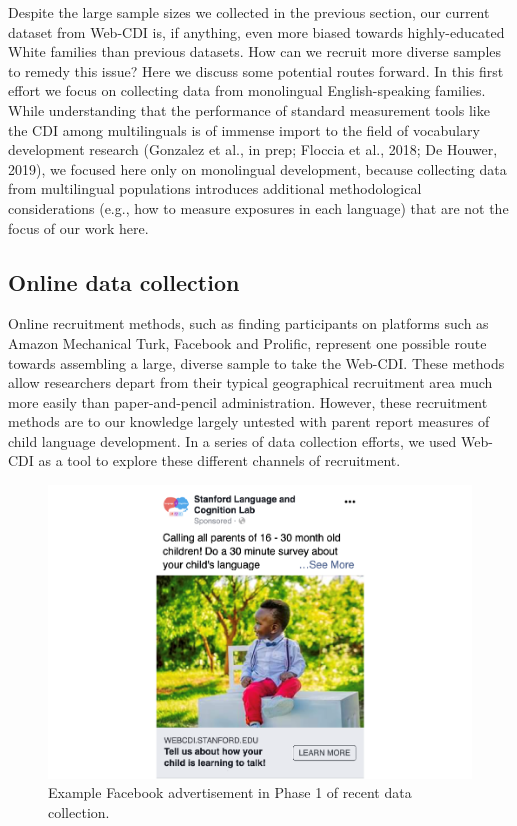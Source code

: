 \documentclass[
  english,
  ,man,floatsintext]{apa6}
\begin{document}
Despite the large sample sizes we collected in the previous section, our current dataset from Web-CDI is, if anything, even more biased towards highly-educated White families than previous datasets. How can we recruit more diverse samples to remedy this issue? Here we discuss some potential routes forward. In this first effort we focus on collecting data from monolingual English-speaking families. While understanding that the performance of standard measurement tools like the CDI among multilinguals is of immense import to the field of vocabulary development research (Gonzalez et al., in prep; Floccia et al., 2018; De Houwer, 2019), we focused here only on monolingual development, because collecting data from multilingual populations introduces additional methodological considerations (e.g., how to measure exposures in each language) that are not the focus of our work here.

\hypertarget{online-data-collection}{%
\subsection{Online data collection}\label{online-data-collection}}

Online recruitment methods, such as finding participants on platforms such as Amazon Mechanical Turk, Facebook and Prolific, represent one possible route towards assembling a large, diverse sample to take the Web-CDI. These methods allow researchers depart from their typical geographical recruitment area much more easily than paper-and-pencil administration. However, these recruitment methods are to our knowledge largely untested with parent report measures of child language development. In a series of data collection efforts, we used Web-CDI as a tool to explore these different channels of recruitment.

\begin{figure}
\centering
\includegraphics{webcdi_paper_files/figure-latex/facebookad-1.pdf}
\caption{\label{fig:facebookad}Example Facebook advertisement in Phase 1 of recent data collection.}
\end{figure}
\end{document}
